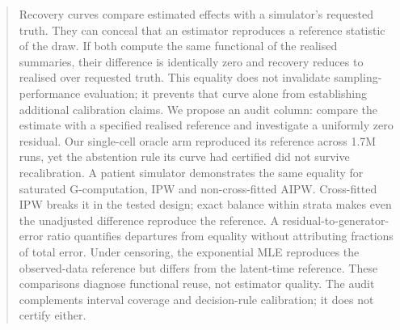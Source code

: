 \begin{abstract}
Recovery curves compare estimated effects with a simulator's requested truth.
They can conceal that an estimator reproduces a reference statistic of the draw.
If both compute the same functional of the realised summaries, their difference
is identically zero and recovery reduces to realised over requested truth.
This equality does not invalidate sampling-performance evaluation; it prevents
that curve alone from establishing additional calibration claims.
We propose an audit column: compare the estimate with a specified realised
reference and investigate a uniformly zero residual. Our single-cell oracle
arm reproduced its reference across 1.7M runs, yet the abstention rule its curve
had certified did not survive recalibration. A patient simulator demonstrates
the same equality for saturated G-computation, IPW and non-cross-fitted AIPW.
Cross-fitted IPW breaks it in the tested design; exact balance within strata
makes even the unadjusted difference reproduce the reference.
\iffull
A residual-to-generator-error ratio quantifies departures from equality without
attributing fractions of total error. Under censoring, the exponential MLE
reproduces the observed-data reference but differs from the latent-time
reference. These comparisons diagnose functional reuse, not estimator quality.
\else
The audit complements interval coverage and decision-rule calibration; it does
not certify either.
\fi
\end{abstract}
